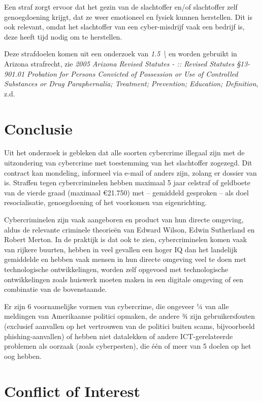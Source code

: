 \documentclass[
]{article}
\begin{document}
Een straf zorgt ervoor dat het gezin van de slachtoffer en/of
slachtoffer zelf genoegdoening krijgt, dat ze weer emotioneel en fysiek
kunnen herstellen. Dit is ook relevant, omdat het slachtoffer van een
cyber-misdrijf vaak een bedrijf is, deze heeft tijd nodig om te
herstellen.

Deze strafdoelen komen uit een onderzoek van \emph{1.5
\textbackslash \cite{Gardiner1958-we}} en worden gebruikt in Arizona
strafrecht, zie \emph{2005 Arizona Revised Statutes - :: Revised
Statutes §13-901.01 Probation for Persons Convicted of Possession or Use
of Controlled Substances or Drug Paraphernalia; Treatment; Prevention;
Education; Definition}, z.d.
\pagebreak
\hypertarget{conclusie}{%
\section{Conclusie}\label{conclusie}}

Uit het onderzoek is gebleken dat alle soorten cybercrime illegaal zijn
met de uitzondering van cybercrime met toestemming van het slachtoffer
zogezegd. Dit contract kan mondeling, informeel via e-mail of anders
zijn, zolang er dossier van is. Straffen tegen cybercriminelen hebben
maximaal 5 jaar celstraf of geldboete van de vierde graad (maximaal
€21.750) met -- gemiddeld gesproken -- als doel resocialisatie,
genoegdoening of het voorkomen van eigenrichting.

Cybercriminelen zijn vaak aangeboren en product van hun directe
omgeving, aldus de relevante criminele theorieën van Edward Wilson,
Edwin Sutherland en Robert Merton. In de praktijk is dat ook te zien,
cybercriminelen komen vaak van rijkere buurten, hebben in veel gevallen
een hoger IQ dan het landelijk gemiddelde en hebben vaak mensen in hun
directe omgeving veel te doen met technologische ontwikkelingen, worden
zelf opgevoed met technologische ontwikkelingen zoals huiswerk moeten
maken in een digitale omgeving of een combinatie van de bovenstaande.

Er zijn 6 voornamelijke vormen van cybercrime, die ongeveer ¼ van alle
meldingen van Amerikaanse politici opmaken, de andere ¾ zijn
gebruikersfouten (exclusief aanvallen op het vertrouwen van de politici
buiten scams, bijvoorbeeld phishing-aanvallen) of hebben niet datalekken
of andere ICT-gerelateerde problemen als oorzaak (zoals cyberpesten),
die één of meer van 5 doelen op het oog hebben.
\pagebreak
\hypertarget{conflict-of-interest}{%
\section{Conflict of Interest}\label{conflict-of-interest}}
\end{document}
